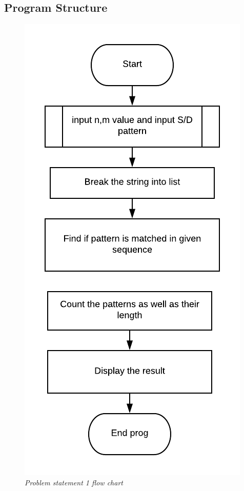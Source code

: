 \documentclass[a4paper,12pt]{article}
\begin{document}
  \subsection{Program Structure}
  \begin{figure}[h!]     
       	\centering
       	\vspace{-2mm}
		\includegraphics[scale=1]{flow1}
		\vspace{-7mm}
		\caption{\textit{Problem statement 1 flow chart}}
		\end{figure}
	
\end{document}
